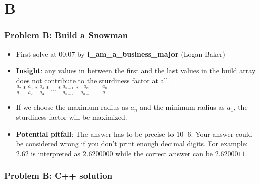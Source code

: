 \section{B}%
\label{sec:B}

\begin{frame}
  \frametitle{Problem B: Build a Snowman}
  \begin{itemize}
    \item First solve at 00:07 by \textbf{i\_am\_a\_business\_major} (Logan Baker)
    \item \textbf{Insight}: any values in between the first and the last values in the build array does not contribute to the sturdiness factor at all.\\
    $\frac{a_2}{a_1} * \frac{a_3}{a_2} * \frac{a_4}{a_3} * ... * \frac{a_{n-1}}{a_{n-2}} * \frac{a_n}{a_{n-1}} = \frac{a_n}{a_1}$
    \item If we choose the maximum radius as $a_n$ and the minimum radius as $a_1$, the sturdiness factor will be maximized.
    \item \textbf{Potential pitfall}: The answer has to be precise to $10^-6$. Your answer could be considered wrong if you don't print enough decimal digits. For example: $2.62$ is interpreted as $2.6200000$ while the correct answer can be $2.6200011$.
  \end{itemize}
\end{frame}


\begin{frame}
	\frametitle{Problem B: C++ solution}
\end{frame}
